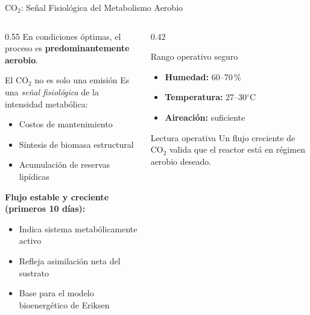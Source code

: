 \documentclass[aspectratio=169, 11pt]{beamer}
\begin{document}
\begin{frame}{CO$_2$: Señal Fisiológica del Metabolismo Aerobio}
\begin{columns}[T]
\begin{column}{0.55\textwidth}
En condiciones óptimas, el proceso es \textbf{predominantemente aerobio}.
\begin{block}{El CO$_2$ no es solo una emisión}
Es una \textit{señal fisiológica} de la intensidad metabólica:
\begin{itemize}
    \item Costos de mantenimiento
    \item Síntesis de biomasa estructural
    \item Acumulación de reservas lipídicas
\end{itemize}
\end{block}
\vspace{0.2cm}
\textbf{Flujo estable y creciente (primeros 10 días):}
\begin{itemize}
    \item Indica sistema metabólicamente activo
    \item Refleja asimilación neta del sustrato
    \item Base para el modelo bioenergético de Eriksen
\end{itemize}
\end{column}
\begin{column}{0.42\textwidth}
\begin{exampleblock}{Rango operativo seguro}
\begin{itemize}
    \item \textbf{Humedad:} 60--70\,\%
    \item \textbf{Temperatura:} 27--30$^\circ$C
    \item \textbf{Aireación:} suficiente
\end{itemize}
\end{exampleblock}
\vspace{0.2cm}
\begin{alertblock}{Lectura operativa}
Un flujo creciente de CO$_2$ valida que el reactor está en régimen aerobio deseado.
\end{alertblock}
\end{column}
\end{columns}
\end{frame}
\end{document}
